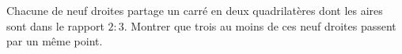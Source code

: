 Chacune de neuf droites partage un carré en deux quadrilatères dont les aires sont dans le rapport $2 : 3$. Montrer que trois au moins de ces neuf droites passent par un même point.
